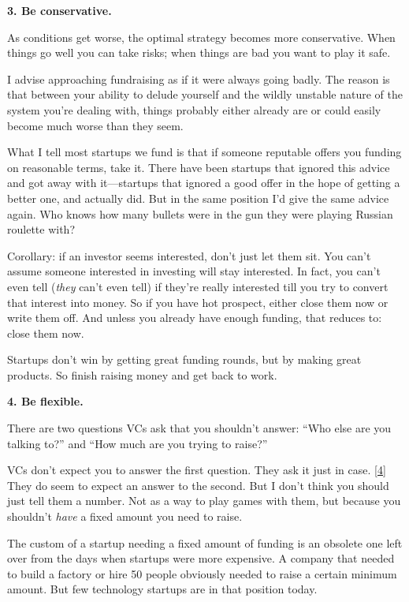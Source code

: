 \textbf{3. Be conservative.}

As conditions get worse, the optimal strategy becomes more conservative.
When things go well you can take risks; when things are bad you want to
play it safe.

I advise approaching fundraising as if it were always going badly. The
reason is that between your ability to delude yourself and the wildly
unstable nature of the system you're dealing with, things probably
either already are or could easily become much worse than they seem.

What I tell most startups we fund is that if someone reputable offers
you funding on reasonable terms, take it. There have been startups that
ignored this advice and got away with it---startups that ignored a good
offer in the hope of getting a better one, and actually did. But in the
same position I'd give the same advice again. Who knows how many bullets
were in the gun they were playing Russian roulette with?

Corollary: if an investor seems interested, don't just let them sit. You
can't assume someone interested in investing will stay interested. In
fact, you can't even tell (\emph{they} can't even tell) if they're
really interested till you try to convert that interest into money. So
if you have hot prospect, either close them now or write them off. And
unless you already have enough funding, that reduces to: close them now.

Startups don't win by getting great funding rounds, but by making great
products. So finish raising money and get back to work.

\textbf{4. Be flexible.}

There are two questions VCs ask that you shouldn't answer: ``Who else
are you talking to?'' and ``How much are you trying to raise?''

VCs don't expect you to answer the first question. They ask it just in
case. {[}\hyperref[f4n]{4}{]} They do seem to expect an answer to the
second. But I don't think you should just tell them a number. Not as a
way to play games with them, but because you shouldn't \emph{have} a
fixed amount you need to raise.

The custom of a startup needing a fixed amount of funding is an obsolete
one left over from the days when startups were more expensive. A company
that needed to build a factory or hire 50 people obviously needed to
raise a certain minimum amount. But few technology startups are in that
position today.

